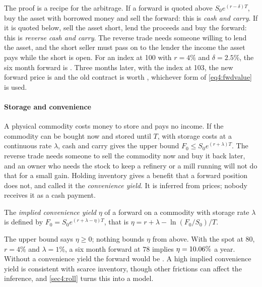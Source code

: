 \begin{chapterrefs}
The proof is a recipe for the arbitrage. If a forward is quoted above $S_0e^{(r-\delta)T}$, buy the
asset with borrowed money and sell the forward: this is \emph{cash and carry}. If it is quoted below,
sell the asset short, lend the proceeds and buy the forward: this is \emph{reverse cash and carry}. The
reverse trade needs someone willing to lend the asset, and the short seller must pass on to the lender
the income the asset pays while the short is open. For an index at 100 with $r=4\%$ and $\delta=2.5\%$,
the six month forward is \fwdIndex. Three months later, with the
index at 103, the new forward price is \fwdIndexLater{} and the old contract is worth \fwdValueLater,
whichever form of \cref{eq4:fwdvalue} is used.

\paragraph{Storage and convenience} A physical commodity costs money to store and pays no income. If the
commodity can be bought now and stored until $T$, with storage costs at a continuous rate $\lambda$,
cash and carry gives the upper bound $F_0\le S_0e^{(r+\lambda)T}$. The reverse trade needs someone to
sell the commodity now and buy it back later, and an owner who needs the stock to keep a refinery or a
mill running will not do that for a small gain. Holding inventory gives a benefit that a forward
position does not, and \textcite{kaldor1939} called it the \emph{convenience yield}. It is inferred
from prices; nobody receives it as a cash payment.

\begin{definition}\label{def4:convenience}
The \emph{implied convenience yield} $\eta$ of a forward on a commodity with storage rate $\lambda$ is
defined by $F_0=S_0e^{(r+\lambda-\eta)T}$, that is $\eta=r+\lambda-\ln(F_0/S_0)/T$.
\end{definition}

The upper bound says $\eta\ge0$; nothing bounds $\eta$ from above. With the spot at 80, $r=4\%$ and
$\lambda=1\%$, a six month forward at 78 implies $\eta=10.06\%$ a year. Without a convenience yield
the forward would be \convNoY. A high implied convenience yield is consistent with scarce inventory,
though other frictions can affect the inference, and \cref{sec4:roll} turns this into a model.


\end{chapterrefs}
